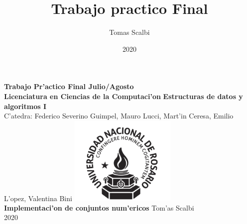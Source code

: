 \documentclass{article}
\title{Trabajo practico Final}
\author{Tomas Scalbi}
\date{2020}
\begin{document}
	\thispagestyle{empty}
	\begin{center}
		\Huge
		\textbf{Trabajo Pr'actico Final Julio/Agosto}\\
		\LARGE
		\vfill
		\textbf{Licenciatura en Ciencias de la Computaci'on}
		\vfill
		\textbf{Estructuras de datos y algoritmos I} \\
		C'atedra: Federico Severino Guimpel, Mauro Lucci, Mart'in Ceresa, Emilio L'opez, Valentina Bini
		\vfill
		\includegraphics[width=2in]{UNRlogo.png} \\
		\vfill
		\textbf{Implementaci'on de conjuntos num'ericos}
		\vfill
		Tom'as Scalbi \\
		2020 \\
	\end{center}
	\pagebreak
	
	\tableofcontents
	
	\pagebreak
\end{document}
